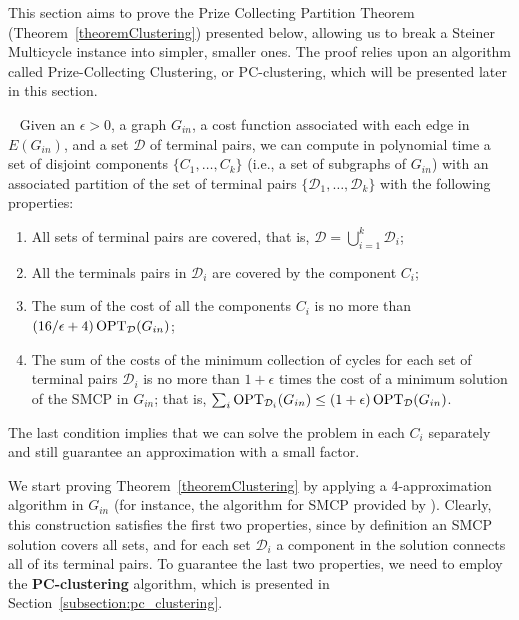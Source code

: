 This section aims to prove the Prize Collecting Partition Theorem (Theorem~\ref{theoremClustering}) presented below, allowing us to break a Steiner Multicycle instance into simpler, smaller ones. The proof relies upon an algorithm called Prize-Collecting Clustering, or PC-clustering, which will be presented later in this section.

\begin{ftheo}~\label{theoremClustering}
Given an \(\epsilon > 0\), a graph \(G_{in}\), a cost function associated with each edge in \(E(G_{in})\), and a set \(\mathcal{D}\) of terminal pairs, we can compute in polynomial time a set of disjoint components \(\{C_1, \dots, C_k\}\) (i.e., a set of subgraphs of \(G_{in}\)) with an associated partition of the set of terminal pairs \(\{\mathcal{D}_1, \dots, \mathcal{D}_k\}\) with the following properties:
\begin{enumerate}
    \item All sets of terminal pairs are covered, that is, \(\mathcal{D} = \bigcup_{i=1}^k \mathcal{D}_i\); \label{condition_t_clust:1}
    \item All the terminals pairs in \(\mathcal{D}_i\) are covered by the component \(C_i\); \label{condition_t_clust:2}
    \item The sum of the cost of all the components \(C_i\) is no more than \((16/\epsilon + 4) \operatorname{\textrm{OPT}}_{\mathcal{D}}(G_{in})\); \label{condition_t_clust:3}
    \item The sum of the costs of the minimum collection of cycles for each set of terminal pairs \(\mathcal{D}_i\) is no more than \(1 + \epsilon\) times the cost of a minimum solution of the SMCP in \(G_{in}\); that is, \(\sum_i \operatorname{\textrm{OPT}}_{\mathcal{D}_i} (G_{in}) \leq (1 + \epsilon) \operatorname{\textrm{OPT}}_{\mathcal{D}} (G_{in})\). \label{condition_t_clust:4}
\end{enumerate}
\end{ftheo}

The last condition implies that we can solve the problem in each \(C_i\) separately and still guarantee an approximation with a small factor.

We start proving Theorem~\ref{theoremClustering} by applying a 4-approximation algorithm in \(G_{in}\) (for instance, the algorithm for SMCP provided by \cite{Pereira2018TheSM}). Clearly, this construction satisfies the first two properties, since by definition an SMCP solution covers all sets, and for each set \(\mathcal{D}_i\) a component in the solution connects all of its terminal pairs. To guarantee the last two properties, we need to employ the \textbf{PC-clustering} algorithm, which is presented in Section~\ref{subsection:pc_clustering}.

